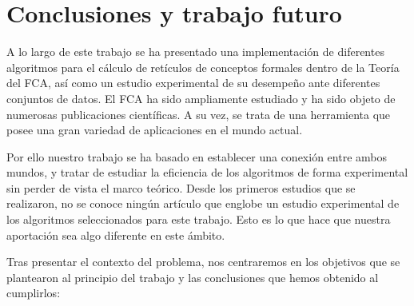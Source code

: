 \documentclass[oneside,openright,titlepage,numbers=noenddot,openany,headinclude,footinclude=true,
cleardoublepage=empty,abstractoff,BCOR=5mm,paper=a4,fontsize=12pt,main=spanish]{scrreprt}
\begin{document}
\chapter{Conclusiones y trabajo futuro}
   \label{chap:8}
A lo largo de este trabajo se ha presentado una implementación de diferentes algoritmos para el cálculo de retículos de conceptos formales dentro de la Teoría del FCA, así como un estudio experimental de su desempeño ante diferentes conjuntos de datos. El FCA ha sido ampliamente estudiado y ha sido objeto de numerosas publicaciones científicas. A su vez, se trata de una herramienta que posee una gran variedad de aplicaciones en el mundo actual. 

Por ello nuestro trabajo se ha basado en establecer una conexión entre ambos mundos, y tratar de estudiar la eficiencia de los algoritmos de forma experimental sin perder de vista el marco teórico. Desde los primeros estudios que se realizaron, no se conoce ningún artículo que englobe un estudio experimental de los algoritmos seleccionados para este trabajo. Esto es lo que hace que nuestra aportación sea algo diferente en este ámbito.

Tras presentar el contexto del problema, nos centraremos en los objetivos que se plantearon al principio del trabajo y las conclusiones que hemos obtenido al cumplirlos:
\end{document}
